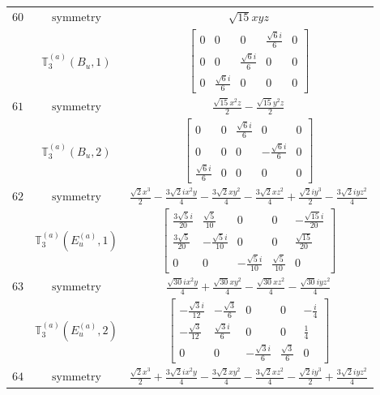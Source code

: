 \documentclass[fleqn,8pt,landscape]{jsarticle}
\begin{document}
\begin{longtable}{ccc}
$ 60 $ & $ \text{symmetry} $ & $ \sqrt{15} x y z $ \\
$  $ & $ \mathbb{T}_{3}^{(a)}(B_{u},1) $ & $ \begin{bmatrix} 0 & 0 & 0 & \frac{\sqrt{6} i}{6} & 0 \\ 0 & 0 & \frac{\sqrt{6} i}{6} & 0 & 0 \\ 0 & \frac{\sqrt{6} i}{6} & 0 & 0 & 0 \end{bmatrix} $ \\ \hline
$ 61 $ & $ \text{symmetry} $ & $ \frac{\sqrt{15} x^{2} z}{2} - \frac{\sqrt{15} y^{2} z}{2} $ \\
$  $ & $ \mathbb{T}_{3}^{(a)}(B_{u},2) $ & $ \begin{bmatrix} 0 & 0 & \frac{\sqrt{6} i}{6} & 0 & 0 \\ 0 & 0 & 0 & - \frac{\sqrt{6} i}{6} & 0 \\ \frac{\sqrt{6} i}{6} & 0 & 0 & 0 & 0 \end{bmatrix} $ \\ \hline
$ 62 $ & $ \text{symmetry} $ & $ \frac{\sqrt{2} x^{3}}{2} - \frac{3 \sqrt{2} i x^{2} y}{4} - \frac{3 \sqrt{2} x y^{2}}{4} - \frac{3 \sqrt{2} x z^{2}}{4} + \frac{\sqrt{2} i y^{3}}{2} - \frac{3 \sqrt{2} i y z^{2}}{4} $ \\
$  $ & $ \mathbb{T}_{3}^{(a)}(E_{u}^{(a)},1) $ & $ \begin{bmatrix} \frac{3 \sqrt{5} i}{20} & \frac{\sqrt{5}}{10} & 0 & 0 & - \frac{\sqrt{15} i}{20} \\ \frac{3 \sqrt{5}}{20} & - \frac{\sqrt{5} i}{10} & 0 & 0 & \frac{\sqrt{15}}{20} \\ 0 & 0 & - \frac{\sqrt{5} i}{10} & \frac{\sqrt{5}}{10} & 0 \end{bmatrix} $ \\ \hline
$ 63 $ & $ \text{symmetry} $ & $ \frac{\sqrt{30} i x^{2} y}{4} + \frac{\sqrt{30} x y^{2}}{4} - \frac{\sqrt{30} x z^{2}}{4} - \frac{\sqrt{30} i y z^{2}}{4} $ \\
$  $ & $ \mathbb{T}_{3}^{(a)}(E_{u}^{(a)},2) $ & $ \begin{bmatrix} - \frac{\sqrt{3} i}{12} & - \frac{\sqrt{3}}{6} & 0 & 0 & - \frac{i}{4} \\ - \frac{\sqrt{3}}{12} & \frac{\sqrt{3} i}{6} & 0 & 0 & \frac{1}{4} \\ 0 & 0 & - \frac{\sqrt{3} i}{6} & \frac{\sqrt{3}}{6} & 0 \end{bmatrix} $ \\ \hline
$ 64 $ & $ \text{symmetry} $ & $ \frac{\sqrt{2} x^{3}}{2} + \frac{3 \sqrt{2} i x^{2} y}{4} - \frac{3 \sqrt{2} x y^{2}}{4} - \frac{3 \sqrt{2} x z^{2}}{4} - \frac{\sqrt{2} i y^{3}}{2} + \frac{3 \sqrt{2} i y z^{2}}{4} $ \\

\end{longtable}
\end{document}
